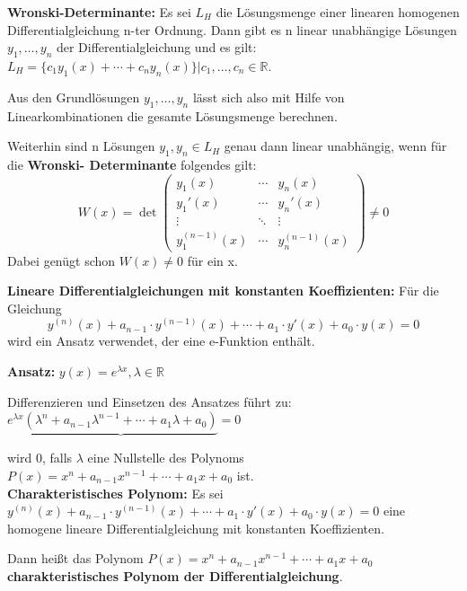 \documentclass[fontset=ubuntu,12pt,a4paper,fleqn]{article}
\begin{document}
\begin{multicols}{2}
	\textbf{Wronski-Determinante:} Es sei \(L_H\) die Lösungsmenge einer linearen homogenen Differentialgleichung n-ter Ordnung. Dann gibt es n linear unabhängige Lösungen \(y_1,\dots,y_n\) der Differentialgleichung und es gilt: \(L_H=\{c_1y_1(x)+\cdots+c_n y_n(x)\}|c_1,\dots,c_n\in\mathbb{R}\).
	
	Aus den Grundlösungen \(y_1,\dots,y_n\) lässt sich also mit Hilfe von Linearkombinationen die gesamte Lösungsmenge berechnen.
	
	Weiterhin sind n Lösungen \(y_1,y_n \in L_H\) genau dann linear unabhängig, wenn für die \textbf{Wronski- Determinante} folgendes gilt:
	\[W(x)=\det\begin{pmatrix}
	y_1(x) & \cdots & y_n(x) \\
	y_1'(x) & \cdots & y_n'(x) \\
	\vdots & \ddots & \vdots \\
	y_1^{(n-1)}(x) & \cdots & y_n^{(n-1)}(x)
	\end{pmatrix} \ne 0 \]
	Dabei genügt schon \(W(x) \ne 0\) für ein x.


\textbf{Lineare Differentialgleichungen mit konstanten Koeffizienten:}
Für die Gleichung
\[y^{(n)}(x) + a_{n-1} \cdot y^{(n-1)}(x) + \cdots + a_1 \cdot y'(x) + a_0 \cdot y(x) = 0\]
wird ein Ansatz verwendet, der eine e-Funktion enthält.

\textbf{Ansatz:} \(y(x)=e^{\lambda x},\lambda\in\mathbb{R}\)

Differenzieren und Einsetzen des Ansatzes führt zu: \\ \(e^{\lambda x}\underbrace{(\lambda^n+a_{n-1}\lambda^{n-1}+\cdots+a_1\lambda+a_0)}=0\)

wird 0, falls \(\lambda\) eine Nullstelle des Polynoms \(P(x)=x^n+a_{n-1}x^{n-1}+\cdots+a_1x+a_0\) ist.\\

\textbf{Charakteristisches Polynom:}
Es sei \(y^{(n)}(x) + a_{n-1} \cdot y^{(n-1)}(x) + \cdots + a_1 \cdot y'(x) + a_0 \cdot y(x) = 0\) eine homogene lineare Differentialgleichung mit konstanten Koeffizienten.

Dann heißt das Polynom \(P(x)=x^n+a_{n-1}x^{n-1}+\cdots+a_1x+a_0\) \\ \textbf{charakteristisches Polynom der Differentialgleichung}.\\


\end{multicols}
\end{document}
